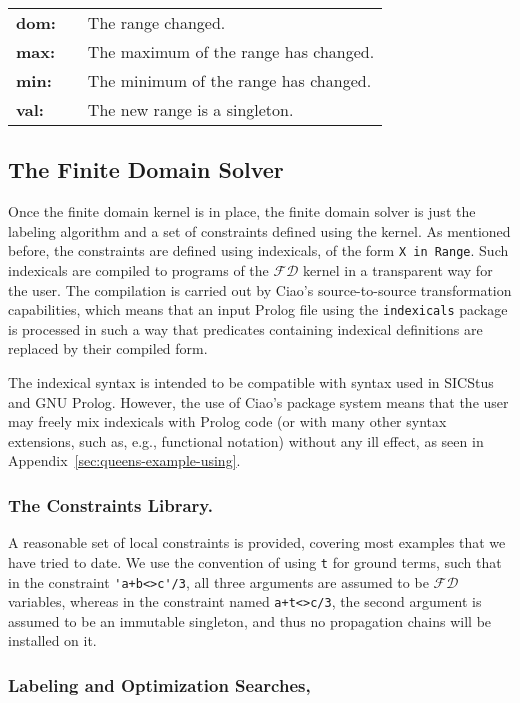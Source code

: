 \documentclass{llncs}
\newcommand{\fd}{$\mathcal{FD}$\xspace}
\begin{document}
\begin{tabular}{lll}
\textbf{dom:} & & The range changed. \\
\textbf{max:} & & The maximum of the range has changed. \\
\textbf{min:} & & The minimum of the range has changed. \\
\textbf{val:} & & The new range is a singleton. \\
\end{tabular}

\subsection{The Finite Domain Solver}

Once the finite domain kernel is in place, the finite domain solver is
just the labeling algorithm and a set of constraints defined using the
kernel. As mentioned before, the constraints are defined using
indexicals, of the form \verb!X in Range!. Such indexicals are
compiled to programs of the \fd kernel in a transparent way for the
user. The compilation is carried out by Ciao's source-to-source
transformation capabilities, which means that an input Prolog file
using the \verb!indexicals! package is processed in such a way that
predicates containing indexical definitions are replaced by their
compiled form.

The indexical syntax is intended to be compatible with syntax used in
SICStus and GNU Prolog. However, the use of Ciao's package system
means that the user may freely mix indexicals with Prolog code (or
with many other syntax extensions, such as, e.g., functional notation)
without any ill effect, as seen in
Appendix~\ref{sec:queens-example-using}.

\subsubsection{The Constraints Library.}
A reasonable set of local constraints is provided, covering most
examples that we have tried to date. We use the convention of using
\verb!t! for ground terms, such that in the constraint
\verb!'a+b<>c'/3!, all three arguments are assumed to be \fd
variables, whereas in the constraint named \verb!a+t<>c/3!, the second
argument is assumed to be an immutable singleton, and thus no
propagation chains will be installed on it.

\subsubsection{Labeling and Optimization Searches,}
\end{document}
